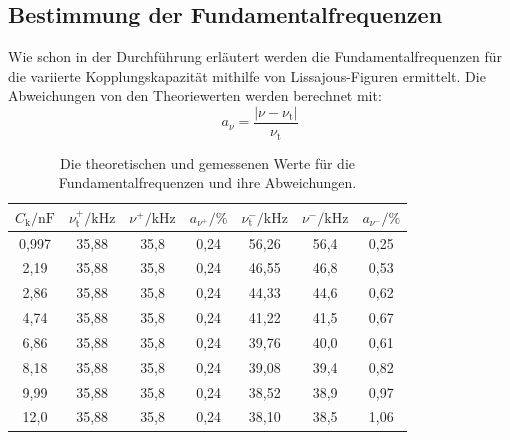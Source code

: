 \documentclass[titlepage = firstcover]{scrartcl}
\begin{document}
    
    \subsection{Bestimmung der Fundamentalfrequenzen}
        Wie schon in der Durchführung erläutert werden die Fundamentalfrequenzen für die variierte Kopplungskapazität mithilfe von Lissajous-Figuren ermittelt.
        Die Abweichungen von den Theoriewerten werden berechnet mit:
        \begin{equation}
            a_\nu = \frac{| \nu - \nu_\text{t} |}{\nu_\text{t}}
        \end{equation}
        \begin{table}[h]
            \centering
            \caption{Die theoretischen und gemessenen Werte für die Fundamentalfrequenzen und ihre Abweichungen.}
            \label{tab:Tabelle2}
            \begin{tabular}{c c c c c c c}
                \toprule
                {$C_\text{k} / \text{nF}$} & {$\nu_\text{t}^+ / \text{kHz}$} & {$\nu^+ / \text{kHz}$} & {$a_{\nu^+} / \%$} & {$\nu_\text{t}^- / \text{kHz}$} & {$\nu^- / \text{kHz}$} & {$a_{\nu^-} / \%$}\\
                \midrule
                0,997 & 35,88 & 35,8 & 0,24 & 56,26 & 56,4 & 0,25 \\
                2,19  & 35,88 & 35,8 & 0,24 & 46,55 & 46,8 & 0,53 \\
                2,86  & 35,88 & 35,8 & 0,24 & 44,33 & 44,6 & 0,62 \\
                4,74  & 35,88 & 35,8 & 0,24 & 41,22 & 41,5 & 0,67 \\
                6,86  & 35,88 & 35,8 & 0,24 & 39,76 & 40,0 & 0,61 \\
                8,18  & 35,88 & 35,8 & 0,24 & 39,08 & 39,4 & 0,82 \\
                9,99  & 35,88 & 35,8 & 0,24 & 38,52 & 38,9 & 0,97 \\
                12,0  & 35,88 & 35,8 & 0,24 & 38,10 & 38,5 & 1,06 \\
                \bottomrule
            \end{tabular}
        \end{table}
        \FloatBarrier
\end{document}
